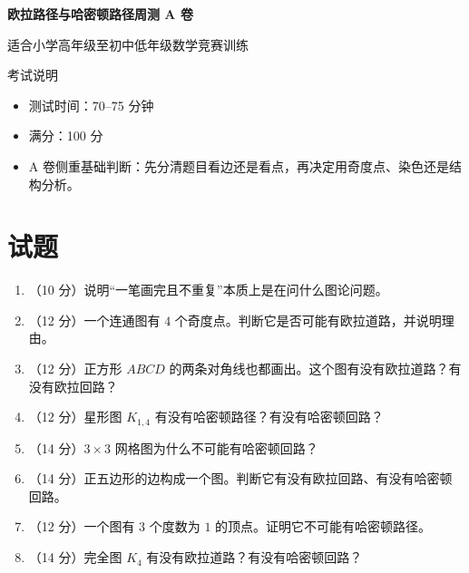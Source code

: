 \documentclass[11pt,a4paper,fontset=fandol]{ctexart}
\newcommand{\answerspace}{\vspace{2.3cm}}
\newcommand{\biganswerspace}{\vspace{3.1cm}}
\begin{document}
\thispagestyle{empty}
\begin{center}
{\fontsize{22}{28}\selectfont\bfseries 欧拉路径与哈密顿路径周测 A 卷\par}
\vspace{0.4cm}
{\large 适合小学高年级至初中低年级数学竞赛训练\par}
\end{center}

\begin{infobox}{考试说明}
\begin{itemize}
  \item 测试时间：70--75 分钟
  \item 满分：100 分
  \item A 卷侧重基础判断：先分清题目看边还是看点，再决定用奇度点、染色还是结构分析。
\end{itemize}
\end{infobox}

\section{试题}

\begin{enumerate}
  \item （10 分）说明“一笔画完且不重复”本质上是在问什么图论问题。
  \answerspace

  \item （12 分）一个连通图有 $4$ 个奇度点。判断它是否可能有欧拉道路，并说明理由。
  \answerspace

  \item （12 分）正方形 $ABCD$ 的两条对角线也都画出。这个图有没有欧拉道路？有没有欧拉回路？
  \answerspace

  \item （12 分）星形图 $K_{1,4}$ 有没有哈密顿路径？有没有哈密顿回路？
  \answerspace

  \item （14 分）$3\times 3$ 网格图为什么不可能有哈密顿回路？
  \biganswerspace

  \item （14 分）正五边形的边构成一个图。判断它有没有欧拉回路、有没有哈密顿回路。
  \biganswerspace

  \item （12 分）一个图有 3 个度数为 $1$ 的顶点。证明它不可能有哈密顿路径。
  \answerspace

  \item （14 分）完全图 $K_4$ 有没有欧拉道路？有没有哈密顿回路？
  \biganswerspace
\end{enumerate}
\end{document}
